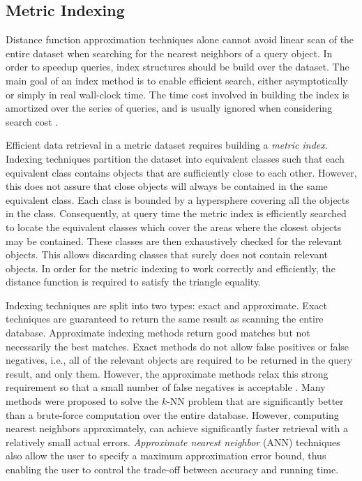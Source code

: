 \subsection{Metric Indexing}
\label{subsec:metric_indexing}

\iftoggle{edit-mode}{\hspace{0pt}\marginpar{Motivation}}{}
Distance function approximation techniques alone cannot avoid linear scan of the entire dataset when searching for the nearest neighbors of a query object. In order to speedup queries, index structures should be build over the dataset. The main goal of an index method is to enable efficient search, either asymptotically or simply in real wall-clock time. The time cost involved in building the index is amortized over the series of queries, and is usually ignored when considering search cost \cite{hetland2009basic}.

\iftoggle{edit-mode}{\hspace{0pt}\marginpar{Introduction}}{}
Efficient data retrieval in a metric dataset requires building a \emph{metric index}. Indexing techniques partition the dataset into equivalent classes such that each equivalent class contains objects that are sufficiently close to each other. However, this does not assure that close objects will always be contained in the same equivalent class. Each class is bounded by a hypersphere covering all the objects in the class. Consequently, at query time the metric index is efficiently searched to locate the equivalent classes which cover the areas where the closest objects may be contained. These classes are then exhaustively checked for the relevant objects.
This allows discarding classes that surely does not contain relevant objects. In order for the metric indexing to work correctly and efficiently, the distance function is required to satisfy the triangle equality.
 
\iftoggle{edit-mode}{\hspace{0pt}\marginpar{Exact vs. Approximate Indexing}}{}
Indexing techniques are split into two types: exact and approximate. Exact techniques are guaranteed to return the same result as  scanning the entire database. Approximate indexing methods return good matches but not necessarily the best matches. Exact methods do not allow false positives or false negatives, i.e., all of the relevant objects are required to be returned in the query result, and only them. However, the approximate methods relax this strong requirement so that a small number of false negatives is acceptable \cite{keogh2005exact}. Many methods were proposed to solve the $k$-NN problem that are significantly better than a brute-force computation over the entire database. However, computing nearest neighbors approximately, can achieve significantly faster retrieval with a relatively small actual errors. \emph{Approximate nearest neighbor} (ANN) techniques also allow the user to specify a maximum approximation error bound, thus enabling the user to control the trade-off between accuracy and running time.

